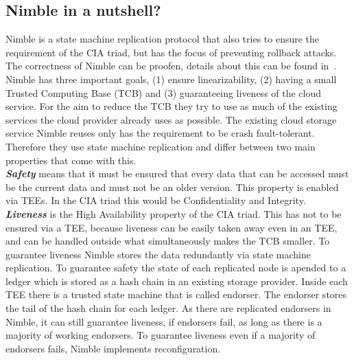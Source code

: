 \subsection{Nimble in a nutshell?}
Nimble is a state machine replication protocol that also tries to ensure the requirement of the CIA triad, but has the focus of preventing rollback attacks. The correctness of Nimble can be proofen, details about this can be found in~\cite{Nimble}.\\
Nimble has three important goals, (1) ensure linearizability, (2) having a small Trusted Computing Base (TCB) and (3) guaranteeing liveness of the cloud service. For the aim to reduce the TCB they try to use as much of the existing services the cloud provider already uses as possible. The existing cloud storage service Nimble reuses only has the requirement to be crash fault-tolerant. Therefore they use state machine replication and differ between two main properties that come with this.\\
	\textbf{\textit{Safety}} means that it must be ensured that every data that can be accessed must be the current data and must not be an older version. This property is enabled via TEEs. In the CIA triad this would be Confidentiality and Integrity.\\
	\textbf{\textit{Liveness}} is the High Availability property of the CIA triad. This has not to be ensured via a TEE, because liveness can be easily taken away even in an TEE, and can be handled outside what simultaneously makes the TCB smaller.
	To guarantee liveness Nimble stores the data redundantly via state machine replication. To guarantee safety the state of each replicated node is apended to a ledger which is stored as a hash chain in an existing storage provider. Inside each TEE there is a trusted state machine that is called endorser. The endorser stores the tail of the hash chain for each ledger. As there are replicated endorsers in Nimble, it can still guarantee liveness, if endorsers fail, as long as there is a majority of working endorsers. To guarantee liveness even if a majority of endorsers fails, Nimble implements reconfiguration. 
